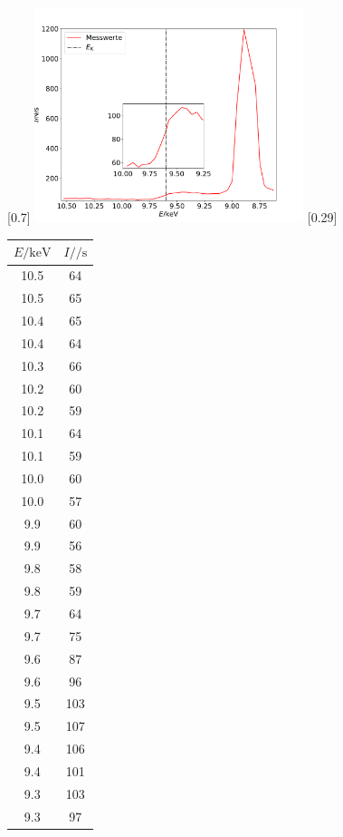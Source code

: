 \begin{figure}
  \centering
  [0.7\textwidth]{
  \includegraphics[width=0.7\textwidth]{zink.pdf}
  }
  \hfill
  [0.29\textwidth]{
  \begin{tabular}{c c}
    \toprule
    $E / \si{\kilo\electronvolt}$ & $I / \si{\per\second}$ \\
    \midrule
    10.5 & 64 \\
    10.5 & 65 \\
    10.4 & 65 \\
    10.4 & 64 \\
    10.3 & 66 \\
    10.2 & 60 \\
    10.2 & 59 \\
    10.1 & 64 \\
    10.1 & 59 \\
    10.0 & 60 \\
    10.0 & 57 \\
    9.9 & 60 \\
    9.9 & 56 \\
    9.8 & 58 \\
    9.8 & 59 \\
    9.7 & 64 \\
    9.7 & 75 \\
    9.6 & 87 \\
    9.6 & 96 \\
    9.5 & 103 \\
    9.5 & 107 \\
    9.4 & 106 \\
    9.4 & 101 \\
    9.3 & 103 \\
    9.3 & 97 \\

\end{tabular}}
\end{figure}

